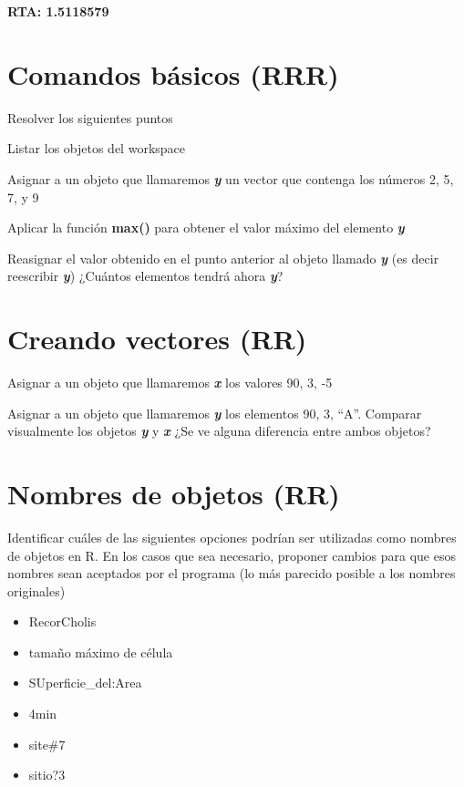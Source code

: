 \documentclass[]{book}
\providecommand{\tightlist}{%
  \setlength{\itemsep}{0pt}\setlength{\parskip}{0pt}}
\begin{document}
\textbf{RTA: 1.5118579 }

\hypertarget{comandos-buxe1sicos-rrr}{%
\section{Comandos básicos (RRR)}\label{comandos-buxe1sicos-rrr}}

Resolver los siguientes puntos

Listar los objetos del workspace

Asignar a un objeto que llamaremos \textbf{\emph{y}} un vector que contenga los números 2, 5, 7, y 9

Aplicar la función \textbf{max()} para obtener el valor máximo del elemento \textbf{\emph{y}}

Reasignar el valor obtenido en el punto anterior al objeto llamado \textbf{\emph{y}} (es decir reescribir \textbf{\emph{y}}) ¿Cuántos elementos tendrá ahora \textbf{\emph{y}}?

\hypertarget{creando-vectores-rr}{%
\section{Creando vectores (RR)}\label{creando-vectores-rr}}

Asignar a un objeto que llamaremos \textbf{\emph{x}} los valores 90, 3, -5

Asignar a un objeto que llamaremos \textbf{\emph{y}} los elementos 90, 3, ``A''. Comparar visualmente los objetos \textbf{\emph{y}} y \textbf{\emph{x}} ¿Se ve alguna diferencia entre ambos objetos?

\hypertarget{nombres-de-objetos-rr}{%
\section{Nombres de objetos (RR)}\label{nombres-de-objetos-rr}}

Identificar cuáles de las siguientes opciones podrían ser utilizadas como nombres de objetos en R. En los casos que sea necesario, proponer cambios para que esos nombres sean aceptados por el programa (lo más parecido posible a los nombres originales)

\begin{itemize}
\tightlist
\item
  RecorCholis\\
\item
  tamaño máximo de célula\\
\item
  SUperficie\_del:Area\\
\item
  4min\\
\item
  site\#7
\item
  sitio?3
\end{itemize}
\end{document}
